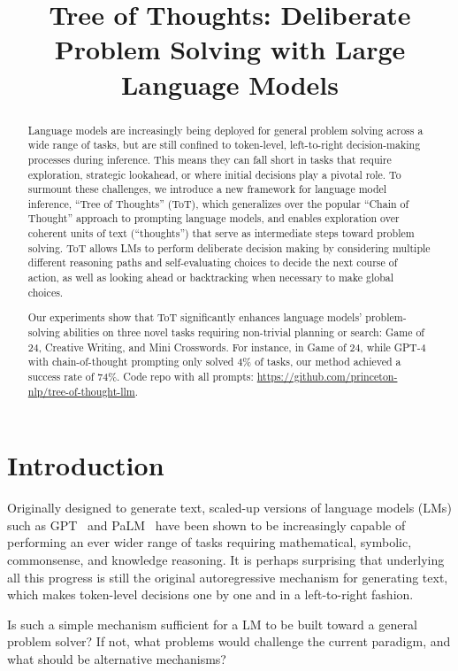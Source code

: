 \title{Tree of Thoughts: Deliberate Problem Solving with Large Language Models}

\begin{abstract}
Language models are increasingly being deployed for general problem solving across a wide range of tasks, but are still confined to token-level, left-to-right decision-making processes during inference. This means they can fall short in tasks that require exploration, strategic lookahead, or where initial decisions play a pivotal role. To surmount these challenges, we introduce a new framework for language model inference, ``Tree of Thoughts'' (ToT), which generalizes over the popular ``Chain of Thought'' approach to prompting language models, and enables exploration over coherent units of text (``thoughts'') that serve as intermediate steps toward problem solving. ToT allows LMs to perform deliberate decision making by considering multiple different reasoning paths and self-evaluating choices to decide the next course of action, as well as looking ahead or backtracking when necessary to make global choices.

Our experiments show that ToT significantly enhances language models’ problem-solving abilities on three novel tasks requiring non-trivial planning or search: Game of 24, Creative Writing, and Mini Crosswords. For instance, in Game of 24, while GPT-4 with chain-of-thought prompting only solved 4\% of tasks, our method achieved a success rate of 74\%.  Code repo with all prompts: \url{https://github.com/princeton-nlp/tree-of-thought-llm}.
\end{abstract}

\section{Introduction}
Originally designed to generate text, scaled-up versions of language models (LMs) such as GPT~\cite{Radford2018ImprovingLU,Radford2019LanguageMA,brown2020language,OpenAI2023GPT4TR} and PaLM~\cite{chowdhery2022palm} have been shown to be increasingly capable of performing an ever wider range of tasks requiring mathematical, symbolic, commonsense, and knowledge reasoning. It is perhaps surprising that underlying all this progress is still the original autoregressive mechanism for generating text, which makes token-level decisions one by one and in a left-to-right fashion.

Is such a simple mechanism sufficient for a LM to be built toward a general problem solver? If not, what problems would challenge the current paradigm, and what should be alternative mechanisms? 

